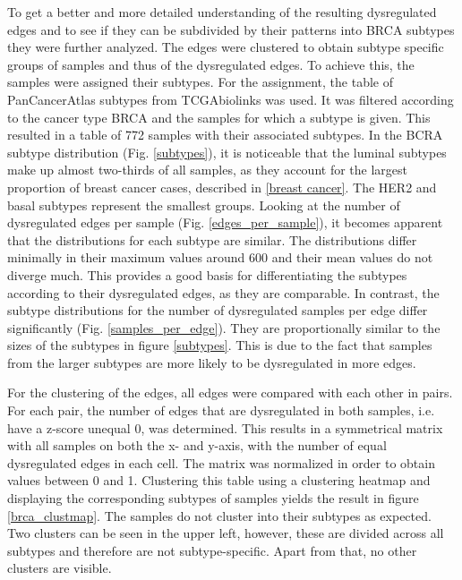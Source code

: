 \documentclass[pdftex,12pt,a4paper]{report}
\begin{document}
To get a better and more detailed understanding of the resulting dysregulated edges and to see if they can be subdivided by their patterns into BRCA subtypes they were further analyzed. The edges were clustered to obtain subtype specific groups of samples and thus of the dysregulated edges. 
To achieve this, the samples were assigned their subtypes. For the assignment, the table of PanCancerAtlas subtypes from TCGAbiolinks\cite{tcgabiolinks} was used. It was filtered according to the cancer type BRCA and the samples for which a subtype is given. This resulted in a table of 772 samples with their associated subtypes. In the BCRA subtype distribution (Fig. \ref{subtypes}), it is noticeable that the luminal subtypes make up almost two-thirds of all samples, as they account for the largest proportion of breast cancer cases, described in \ref{breast cancer}. The HER2 and basal subtypes represent the smallest groups. 
Looking at the number of dysregulated edges per sample (Fig. \ref{edges_per_sample}), it becomes apparent that the distributions for each subtype are similar. The distributions differ minimally in their maximum values around 600 and their mean values do not diverge much. This provides a good basis for differentiating the subtypes according to their dysregulated edges, as they are comparable. In contrast, the subtype distributions for the number of dysregulated samples per edge differ significantly (Fig. \ref{samples_per_edge}). They are proportionally similar to the sizes of the subtypes in figure \ref{subtypes}. This is due to the fact that samples from the larger subtypes are more likely to be dysregulated in more edges.

For the clustering of the edges, all edges were compared with each other in pairs. For each pair, the number of edges that are dysregulated in both samples, i.e. have a z-score unequal 0, was determined. This results in a symmetrical matrix with all samples on both the x- and y-axis, with the number of equal dysregulated edges in each cell. The matrix was normalized in order to obtain values between 0 and 1. Clustering this table using a clustering heatmap and displaying the corresponding subtypes of samples yields the result in figure \ref{brca_clustmap}. 
The samples do not cluster into their subtypes as expected. Two clusters can be seen in the upper left, however, these are divided across all subtypes and therefore are not subtype-specific. Apart from that, no other clusters are visible.
\end{document}
